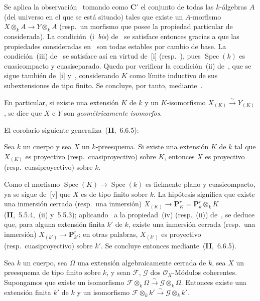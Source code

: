 Se aplica la observación~ tomando como $\boldsymbol{C}'$ el conjunto de todas las $k$-álgebras $A$ (del universo en el que se está situado) tales que existe un $A$-morfismo $X\otimes_k A\to Y\otimes_k A$ (resp.\ un morfismo que posee la propiedad particular de~ considerada).
La condición~(i~\emph{bis}) de~ se satisface entonces gracias a que las
propiedades consideradas en~ son todas estables por cambio de base.
La condición~(iii) de~ se satisface así en virtud de~[i] (resp.\ ), pues $\operatorname{Spec}(k)$ es cuasicompacto y cuasiseparado.
Queda por verificar la condición~(ii) de~, que se sigue también de~[i] y~, considerando $K$ como límite inductivo de sus subextensiones de tipo finito.
Se concluye, por tanto, mediante~.

En particular, si existe una extensión $K$ de $k$ y un $K$-isomorfismo $X_{(K)}\xrightarrow{\sim}Y_{(K)}$, se dice que $X$ e $Y$ son \emph{geométricamente isomorfos}.

El corolario siguiente generaliza~(\textbf{II},~6.6.5):

\begin{corollary}[9.1.5]
\label{IV.9.1.5}
Sea $k$ un cuerpo y sea $X$ un $k$-preesquema.
Si existe una extensión $K$ de $k$ tal que $X_{(K)}$ es proyectivo \textnormal{(resp.}\ cuasiproyectivo\textnormal{)} sobre $K$, entonces $X$ es proyectivo \textnormal{(resp.}\ cuasiproyectivo\textnormal{)} sobre $k$.
\end{corollary}

Como el morfismo $\operatorname{Spec}(K)\to\operatorname{Spec}(k)$ es fielmente plano y cuasicompacto, ya se sigue de~[v] que $X$ es de tipo finito sobre $k$.
La hipótesis significa que existe una inmersión cerrada (resp.\ una inmersión) $X_{(K)}\to\mathbf P_K^r=\mathbf P_k^r\otimes_k K$ (\textbf{II},~5.5.4,~(ii) y~5.5.3); aplicando~ a la propiedad~(iv) (resp.~(ii)) de~, se deduce que, para alguna extensión finita $k'$ de $k$, existe una inmersión cerrada (resp.\ una inmersión) $X_{(k')}\to\mathbf P_{k'}^r$; en otras palabras, $X_{(k')}$ es proyectivo (resp.\ cuasiproyectivo) sobre $k'$.
Se concluye entonces mediante~(\textbf{II},~6.6.5).

\begin{proposition}[9.1.6]
\label{IV.9.1.6}
Sea $k$ un cuerpo, sea $\Omega$ una extensión algebraicamente cerrada de $k$, sea $X$ un preesquema de tipo finito sobre $k$, y sean $\mathcal F$, $\mathcal G$ dos $\mathcal O_X$-Módulos coherentes.
Supongamos que existe un isomorfismo $\mathcal F\otimes_k\Omega\xrightarrow{\sim}\mathcal G\otimes_k\Omega$.
Entonces existe una extensión finita $k'$ de $k$ y un isomorfismo $\mathcal F\otimes_k k'\xrightarrow{\sim}\mathcal G\otimes_k k'$.
\end{proposition}

